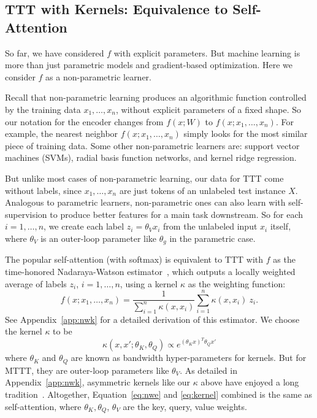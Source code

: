 \documentclass{article}
\begin{document}
\subsection{TTT with Kernels: Equivalence to Self-Attention}
\label{subsec:kernel}
So far, we have considered $f$ with explicit parameters.
But machine learning is more than just parametric models and gradient-based optimization.
Here we consider $f$ as a non-parametric learner.

Recall that non-parametric learning produces an algorithmic function controlled by the training data $x_1, \dots, x_n$, without explicit parameters of a fixed shape.
So our notation for the encoder changes from $f(x; W)$ to $f(x; x_1, \dots, x_n)$.
For example, the nearest neighbor $f(x; x_1, \dots, x_n)$ simply looks for the most similar piece of training data.
Some other non-parametric learners are: support vector machines (SVMs), radial basis function networks, and kernel ridge regression.

But unlike most cases of non-parametric learning, our data for TTT come without labels, since $x_1, \dots, x_n$ are just tokens of an unlabeled test instance $X$. 
Analogous to parametric learners, non-parametric ones can also learn with self-supervision to produce better features for a main task downstream.
So for each $i=1,\dots,n$, we create each label $z_i = \theta_V x_i$ from the unlabeled input $x_i$ itself, where $\theta_V$ is an outer-loop parameter like $\theta_g$ in the parametric case.

The popular self-attention (with softmax) is equivalent to TTT with $f$ as the time-honored Nadaraya-Watson estimator~\citep{bierens1988nadaraya, cai2001weighted}, which outputs a locally weighted average of labels $z_i$, $i=1,\dots,n$, using a kernel $\kappa$ as the weighting function:
\begin{equation}
\label{eq:nwe}
    f(x; x_1, \dots, x_n) = \frac{1}{\sum_{i=1}^n \kappa(x, x_i)} \sum_{i=1}^n \kappa(x, x_i) ~z_i.
\end{equation}
See Appendix~\ref{app:nwk} for a detailed derivation of this estimator.
We choose the kernel $\kappa$ to be
\begin{equation}
\label{eq:kernel}
\kappa(x, x'; \theta_K, \theta_Q) \propto e^{(\theta_Kx)^T \theta_Qx'}
\end{equation}
where $\theta_K$ and $\theta_Q$ are known as bandwidth hyper-parameters for kernels. But for MTTT, they are outer-loop parameters like $\theta_V$.
As detailed in Appendix~\ref{app:nwk},
asymmetric kernels like our $\kappa$ above have enjoyed a long tradition~\citep{breiman1977variable,chen2017tutorial}.
Altogether, Equation~\ref{eq:nwe} and \ref{eq:kernel} combined is the same as self-attention, where $\theta_K, \theta_Q$, $\theta_V$ are the key, query, value weights.
\end{document}
